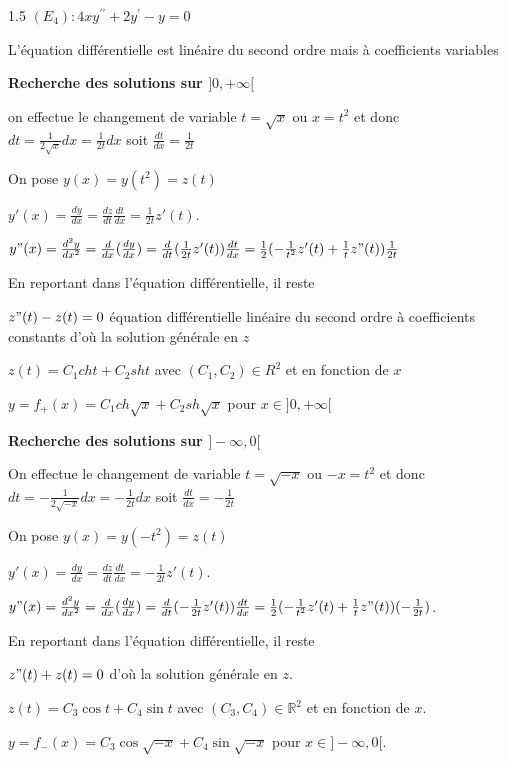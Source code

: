 \documentclass[12pt]{article}
\begin{document}
\begin{spacing}{1.5}
\vspace{1cm}
$(E_4): 4xy^{\prime\prime}+2y^{\prime}-y=0$

L'équation différentielle est linéaire du second ordre mais à coefficients variables

\textbf{Recherche des solutions sur $]0,+\infty[$}

on effectue le changement de variable $t=\sqrt{x}$ ou $x = t^2$ et donc $dt=\frac{1}{2\sqrt{x}}dx=\frac{1}{2t}dx$ soit $\frac{dt}{dx}=\frac{1}{2t}$

On pose $y(x)=y(t^2)=z(t)$

$y'(x)=\frac{dy}{dx}=\frac{dz}{dt}\frac{dt}{dx}=\frac{1}{2t}z'(t)$.

$y"(x)=\frac{d^2y}{dx^2}=\frac{d}{dx}(\frac{dy}{dx})=\frac{d}{dt}(\frac{1}{2t}z'(t))\frac{dt}{dx}=\frac{1}{2}(-\frac{1}{t^2}z'(t)+\frac{1}{t}z"(t))\frac{1}{2t}$

En reportant dans l'équation différentielle, il reste

$z"(t)-z(t) = 0$ équation différentielle linéaire du second ordre à coefficients constants d'où la solution générale en $z$

$z(t) = C_1cht + C_2sht$ avec $(C_1,C_2 )\in R^2$
et en fonction de $x$

\textbf{ $y = f_+(x) = C_1ch\sqrt{x}+C_2sh\sqrt{x}$}  pour $x \in ]0,+\infty[$

 \vspace{1cm}
 
\textbf{ Recherche des solutions sur $]- \infty, 0 [$ }

On effectue le changement de variable $t =\sqrt{-x}$ ou $-x=t^2$ et donc $dt =-\frac{1}{2\sqrt{-x}}dx=-\frac{1}{2t}dx$ soit $\frac{dt}{dx}=-\frac{1}{2t}$

On pose $y(x)=y(-t^2)=z(t)$

$y'(x)=\frac{dy}{dx}=\frac{dz}{dt}\frac{dt}{dx}=-\frac{1}{2t}z'(t)$.

$y"(x)=\frac{d^2y}{dx^2}=\frac{d}{dx}(\frac{dy}{dx})=\frac{d}{dt}(-\frac{1}{2t}z'(t))\frac{dt}{dx}=\frac{1}{2}(-\frac{1}{t^2}z'(t)+\frac{1}{t}z"(t))(-\frac{1}{2t})$.

En reportant dans l'équation différentielle, il reste

$z"(t) + z(t) = 0$ d'où la solution générale en $z$.

$z(t) = C_3 \cos t + C_4 \sin t$ avec $(C_3,C_4 )\in \mathbb{R}^2$ et en fonction de $x$.

\textbf{$y = f_-(x) = C_3 \cos\sqrt{-x} + C_4 \sin\sqrt{-x}$} pour $x\in ]-\infty, 0[$.


\end{spacing}
\end{document}
